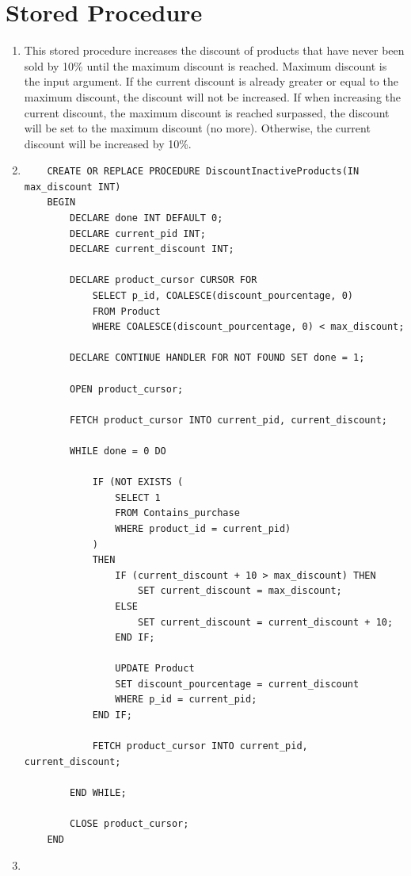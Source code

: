 \documentclass[a4paper,11pt]{article}
\begin{document}
\section*{Stored Procedure}

\begin{enumerate}[label=(\alph*)]
    \item This stored procedure increases the discount of products that have never been sold by 10\% until the maximum discount is reached. Maximum discount is the input argument.
    If the current discount is already greater or equal to the maximum discount, the discount will not be increased.
    If when increasing the current discount, the maximum discount is reached surpassed, the discount will be set to the maximum discount (no more).
    Otherwise, the current discount will be increased by 10\%.
    \item
    \begin{lstlisting}
    CREATE OR REPLACE PROCEDURE DiscountInactiveProducts(IN max_discount INT)
    BEGIN
        DECLARE done INT DEFAULT 0;
        DECLARE current_pid INT;
        DECLARE current_discount INT;
    
        DECLARE product_cursor CURSOR FOR
            SELECT p_id, COALESCE(discount_pourcentage, 0)
            FROM Product
            WHERE COALESCE(discount_pourcentage, 0) < max_discount;
    
        DECLARE CONTINUE HANDLER FOR NOT FOUND SET done = 1;
    
        OPEN product_cursor;
    
        FETCH product_cursor INTO current_pid, current_discount;
    
        WHILE done = 0 DO

            IF (NOT EXISTS (
                SELECT 1
                FROM Contains_purchase
                WHERE product_id = current_pid)
            )
            THEN
                IF (current_discount + 10 > max_discount) THEN
                    SET current_discount = max_discount;
                ELSE 
                    SET current_discount = current_discount + 10;
                END IF;
    
                UPDATE Product
                SET discount_pourcentage = current_discount
                WHERE p_id = current_pid;
            END IF;
    
            FETCH product_cursor INTO current_pid, current_discount;
    
        END WHILE;
    
        CLOSE product_cursor;
    END
    \end{lstlisting}
    \item 
\end{enumerate}
\end{document}
